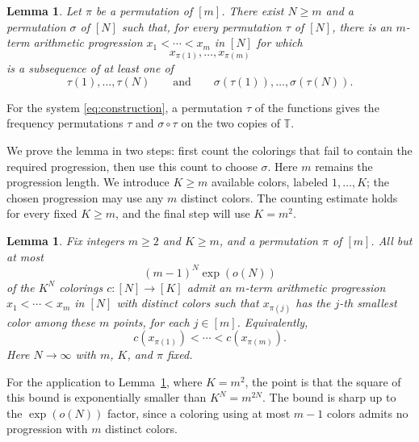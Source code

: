 \documentclass[10pt,a4paper]{amsart}
\newtheorem{lemma}[theorem]{Lemma}
\numberwithin{equation}{section}
\newcommand{\T}{\mathbb T}
\begin{document}
\begin{lemma}\label{lem:two}
Let $\pi$ be a permutation of $[m]$. There exist $N\geq m$ and a permutation $\sigma$ of $[N]$ such that, for every permutation $\tau$ of $[N]$, there is an $m$-term arithmetic progression $x_1<\cdots<x_m$ in $[N]$ for which
\[
 x_{\pi(1)},\ldots,x_{\pi(m)}
\]
is a subsequence of at least one of
\[
 \tau(1),\ldots,\tau(N)
 \qquad\text{and}\qquad
 \sigma(\tau(1)),\ldots,\sigma(\tau(N)).
\]
\end{lemma}


For the system \eqref{eq:construction}, a permutation $\tau$ of the functions gives the frequency permutations $\tau$ and $\sigma\circ\tau$ on the two copies of $\T$.

We prove the lemma in two steps: first count the colorings that fail to contain the required progression, then use this count to choose $\sigma$. Here $m$ remains the progression length. We introduce $K\geq m$ available colors, labeled $1,\ldots,K$; the chosen progression may use any $m$ distinct colors. The counting estimate holds for every fixed $K\geq m$, and the final step will use $K=m^2$.

\begin{lemma}\label{lem:count}
Fix integers $m\geq2$ and $K\geq m$, and a permutation $\pi$ of $[m]$. All but at most
\begin{equation}\label{eq:count}
 (m-1)^N\exp(o(N))
\end{equation}
of the $K^N$ colorings $c:[N]\to[K]$ admit an $m$-term arithmetic progression $x_1<\cdots<x_m$ in $[N]$ with distinct colors such that $x_{\pi(j)}$ has the $j$-th smallest color among these $m$ points, for each $j\in[m]$. Equivalently,
\begin{equation}\label{eq:pattern}
 c(x_{\pi(1)})<\cdots<c(x_{\pi(m)}).
\end{equation}
Here $N\to\infty$ with $m$, $K$, and $\pi$ fixed.
\end{lemma}

For the application to Lemma~\ref{lem:two}, where $K=m^2$, the point is that the square of this bound is exponentially smaller than $K^N=m^{2N}$. The bound is sharp up to the $\exp(o(N))$ factor, since a coloring using at most $m-1$ colors admits no progression with $m$ distinct colors.
\end{document}
